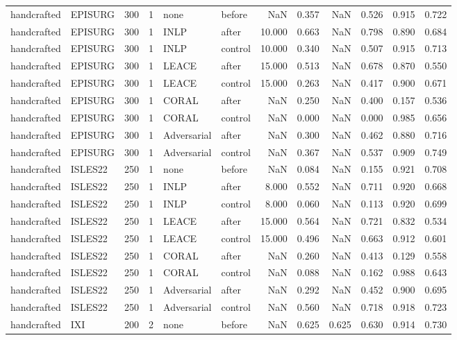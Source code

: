 \begin{tabular}{llrrllrrrrrr}
handcrafted & EPISURG & 300 & 1 & none & before & NaN & 0.357 & NaN & 0.526 & 0.915 & 0.722 \\
handcrafted & EPISURG & 300 & 1 & INLP & after & 10.000 & 0.663 & NaN & 0.798 & 0.890 & 0.684 \\
handcrafted & EPISURG & 300 & 1 & INLP & control & 10.000 & 0.340 & NaN & 0.507 & 0.915 & 0.713 \\
handcrafted & EPISURG & 300 & 1 & LEACE & after & 15.000 & 0.513 & NaN & 0.678 & 0.870 & 0.550 \\
handcrafted & EPISURG & 300 & 1 & LEACE & control & 15.000 & 0.263 & NaN & 0.417 & 0.900 & 0.671 \\
handcrafted & EPISURG & 300 & 1 & CORAL & after & NaN & 0.250 & NaN & 0.400 & 0.157 & 0.536 \\
handcrafted & EPISURG & 300 & 1 & CORAL & control & NaN & 0.000 & NaN & 0.000 & 0.985 & 0.656 \\
handcrafted & EPISURG & 300 & 1 & Adversarial & after & NaN & 0.300 & NaN & 0.462 & 0.880 & 0.716 \\
handcrafted & EPISURG & 300 & 1 & Adversarial & control & NaN & 0.367 & NaN & 0.537 & 0.909 & 0.749 \\
handcrafted & ISLES22 & 250 & 1 & none & before & NaN & 0.084 & NaN & 0.155 & 0.921 & 0.708 \\
handcrafted & ISLES22 & 250 & 1 & INLP & after & 8.000 & 0.552 & NaN & 0.711 & 0.920 & 0.668 \\
handcrafted & ISLES22 & 250 & 1 & INLP & control & 8.000 & 0.060 & NaN & 0.113 & 0.920 & 0.699 \\
handcrafted & ISLES22 & 250 & 1 & LEACE & after & 15.000 & 0.564 & NaN & 0.721 & 0.832 & 0.534 \\
handcrafted & ISLES22 & 250 & 1 & LEACE & control & 15.000 & 0.496 & NaN & 0.663 & 0.912 & 0.601 \\
handcrafted & ISLES22 & 250 & 1 & CORAL & after & NaN & 0.260 & NaN & 0.413 & 0.129 & 0.558 \\
handcrafted & ISLES22 & 250 & 1 & CORAL & control & NaN & 0.088 & NaN & 0.162 & 0.988 & 0.643 \\
handcrafted & ISLES22 & 250 & 1 & Adversarial & after & NaN & 0.292 & NaN & 0.452 & 0.900 & 0.695 \\
handcrafted & ISLES22 & 250 & 1 & Adversarial & control & NaN & 0.560 & NaN & 0.718 & 0.918 & 0.723 \\
handcrafted & IXI & 200 & 2 & none & before & NaN & 0.625 & 0.625 & 0.630 & 0.914 & 0.730 \\

\end{tabular}
